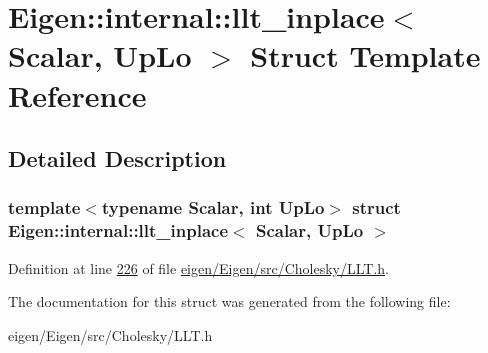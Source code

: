 \hypertarget{struct_eigen_1_1internal_1_1llt__inplace}{}\section{Eigen\+:\+:internal\+:\+:llt\+\_\+inplace$<$ Scalar, Up\+Lo $>$ Struct Template Reference}
\label{struct_eigen_1_1internal_1_1llt__inplace}


\subsection{Detailed Description}
\subsubsection*{template$<$typename Scalar, int Up\+Lo$>$\newline
struct Eigen\+::internal\+::llt\+\_\+inplace$<$ Scalar, Up\+Lo $>$}



Definition at line \hyperlink{eigen_2_eigen_2src_2_cholesky_2_l_l_t_8h_source_l00226}{226} of file \hyperlink{eigen_2_eigen_2src_2_cholesky_2_l_l_t_8h_source}{eigen/\+Eigen/src/\+Cholesky/\+L\+L\+T.\+h}.



The documentation for this struct was generated from the following file\+:\begin{DoxyCompactItemize}
\item 
eigen/\+Eigen/src/\+Cholesky/\+L\+L\+T.\+h\end{DoxyCompactItemize}
